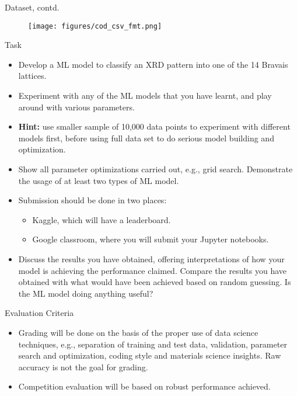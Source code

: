 \documentclass[aspectratio=169]{beamer}
\begin{document}
\begin{frame}{Dataset, contd.}
\begin{figure}
    \centering
    \texttt{[image: figures/cod\_csv\_fmt.png]}
\end{figure}
\end{frame}


\begin{frame}{Task}
    \begin{itemize}
        \item Develop a ML model to classify an XRD pattern into one of the 14 Bravais lattices. 
        \item Experiment with any of the ML models that you have learnt, and play around with various parameters. 
        \item \textbf{Hint:} use smaller sample of 10,000 data points to experiment with different models first, before using full data set to do serious model building and optimization. 
        \item Show all parameter optimizations carried out, e.g., grid search. Demonstrate the usage of at least two types of ML model. 
        \item Submission should be done in two places:
        \begin{itemize}
            \item Kaggle, which will have a leaderboard.
            \item Google classroom, where you will submit your Jupyter notebooks.
        \end{itemize}
        \item Discuss the results you have obtained, offering interpretations of how your model is achieving the performance claimed. Compare the results you have obtained with what would have been achieved based on random guessing. Is the ML model doing anything useful?
    \end{itemize}
\end{frame}


\begin{frame}{Evaluation Criteria}
    \begin{itemize}
        \item Grading will be done on the basis of the proper use of data science techniques, e.g., separation of training and test data, validation, parameter search and optimization, coding style and materials science insights. Raw accuracy is not the goal for grading.
        \item Competition evaluation will be based on robust performance achieved.
    \end{itemize}
\end{frame}
\end{document}
